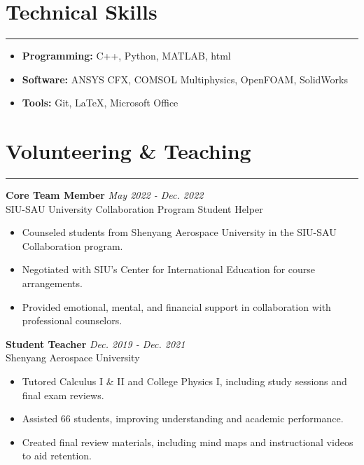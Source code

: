 \documentclass[11pt]{article}
\begin{document}
\vspace{2mm}

\section*{Technical Skills}
\hrule
\begin{itemize}[leftmargin=*,itemsep=1pt]
    \item \textbf{Programming:} C++, Python, MATLAB, html
    \item \textbf{Software:} ANSYS CFX, COMSOL Multiphysics, OpenFOAM, SolidWorks
    \item \textbf{Tools:} Git, LaTeX, Microsoft Office
\end{itemize}

\vspace{2mm}

\section*{Volunteering \& Teaching}
\hrule

\noindent\textbf{Core Team Member} \hfill \textit{May 2022 - Dec. 2022} \\
SIU-SAU University Collaboration Program Student Helper
\begin{itemize}[leftmargin=*,itemsep=1pt]
    \item Counseled students from Shenyang Aerospace University in the SIU-SAU Collaboration program.
    \item Negotiated with SIU's Center for International Education for course arrangements.
    \item Provided emotional, mental, and financial support in collaboration with professional counselors.
\end{itemize}

\vspace{2mm}

\noindent \textbf{Student Teacher} \hfill \textit{Dec. 2019 - Dec. 2021} \\
Shenyang Aerospace University
\begin{itemize}[leftmargin=*,itemsep=1pt] 
    \item Tutored Calculus I \& II and College Physics I, including study sessions and final exam reviews.
    \item Assisted 66 students, improving understanding and academic performance.
    \item Created final review materials, including mind maps and instructional videos to aid retention.
\end{itemize}
\end{document}
